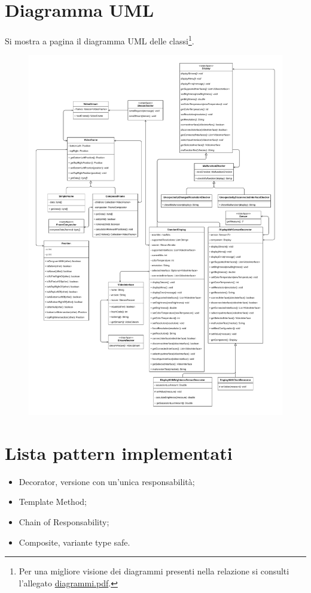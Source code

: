 \documentclass[a4paper,11pt]{article}
\begin{document}
	\section{Diagramma UML}
	Si mostra a pagina \pageref{fig:classdiagram} il diagramma UML delle classi\footnote{Per una migliore visione dei diagrammi presenti nella relazione si consulti l'allegato \href{diagrammi.pdf}{diagrammi.pdf}.}.\\
	\begin{figure}[p]
		\noindent\includegraphics[width=\textwidth]{diagramma/ClassDiagramm-Types.pdf}
		\label{fig:classdiagram}
	\end{figure}
	
	\section{Lista pattern implementati}
	\begin{itemize}
		\item Decorator, versione con un'unica responsabilità;
		\item Template Method;
		\item Chain of Responsability;
		\item Composite, variante type safe.
	\end{itemize}
	
\end{document}

